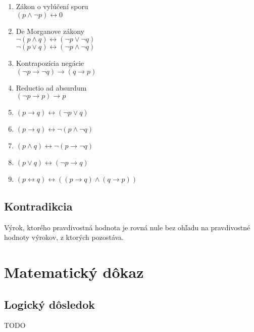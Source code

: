 \begin{enumerate}
    \item Zákon o vylúčení sporu\\
    $( p \wedge \neg  p) \leftrightarrow  0$\\
    \item De Morganove zákony\\
    $\neg ( p \wedge q) \leftrightarrow  ( \neg  p \vee \neg q)$\\
    $\neg ( p \vee q) \leftrightarrow  ( \neg  p \wedge \neg q)$\\
    \item Kontrapozícia negácie\\
    $(\neg p \rightarrow \neg q) \rightarrow ( q \rightarrow p)$\\
    \item Reductio ad absurdum\\
    $(\neg p \rightarrow p) \rightarrow p$\\
    \item $( p \rightarrow q) \leftrightarrow  ( \neg  p \vee q)$\\
    \item $( p \rightarrow q) \leftrightarrow  \neg ( p \wedge \neg q)$\\
    \item $( p \wedge q) \leftrightarrow  \neg ( p \rightarrow \neg q)$\\
    \item $( p \vee q) \leftrightarrow ( \neg  p \rightarrow q)$\\
    \item $( p \leftrightarrow  q) \leftrightarrow  (( p \rightarrow q) \wedge ( q \rightarrow p))$\\
    \end{enumerate}


  \subsection*{Kontradikcia}
  Výrok, ktorého pravdivostná hodnota je rovná nule bez ohľadu na pravdivostné hodnoty výrokov, z ktorých pozostáva.


\section{Matematický dôkaz}

  \subsection*{Logický dôsledok}
	TODO
